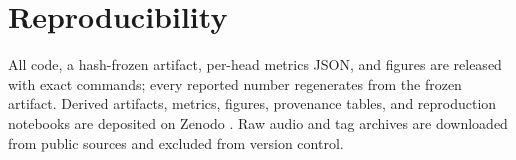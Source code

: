 \documentclass[11pt]{article}
\begin{document}
\vspace{-0.3em}
\section{Reproducibility}
All code, a hash-frozen artifact, per-head metrics JSON, and figures are released with exact
commands; every reported number regenerates from the frozen artifact. Derived artifacts,
metrics, figures, provenance tables, and reproduction notebooks are deposited on Zenodo
\citep{orcadolittle_zenodo}. Raw audio and tag archives are downloaded from public sources
and excluded from version control.

{\small


}
\end{document}
